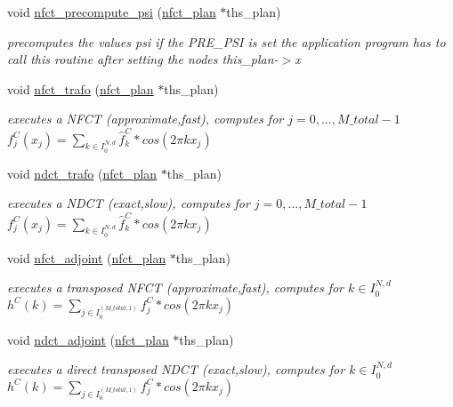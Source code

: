 \begin{CompactItemize}
void \hyperlink{group__nfsct_g2792eada84d4d363e308825dc40c2e6d}{nfct\_\-precompute\_\-psi} (\hyperlink{structnfct__plan}{nfct\_\-plan} $\ast$ths\_\-plan)
\begin{CompactList}\small\item\em precomputes the values psi if the PRE\_\-PSI is set the application program has to call this routine after setting the nodes this\_\-plan-$>$x \item\end{CompactList}\item 
void \hyperlink{group__nfsct_g73327e4f32328dcae3e9f86572a0e15a}{nfct\_\-trafo} (\hyperlink{structnfct__plan}{nfct\_\-plan} $\ast$ths\_\-plan)
\begin{CompactList}\small\item\em executes a NFCT (approximate,fast), computes for $j=0,...,M\_total-1$ $f_j^C(x_j) = \sum_{k \in I_0^{N,d}} \hat{f}_k^C * cos(2 \pi k x_j)$ \item\end{CompactList}\item 
void \hyperlink{group__nfsct_ga0ba8106a8051bb76b084543a6196b2c}{ndct\_\-trafo} (\hyperlink{structnfct__plan}{nfct\_\-plan} $\ast$ths\_\-plan)
\begin{CompactList}\small\item\em executes a NDCT (exact,slow), computes for $j=0,...,M\_total-1$ $f_j^C(x_j) = \sum_{k \in I_0^{N,d}} \hat{f}_k^C * cos(2 \pi k x_j)$ \item\end{CompactList}\item 
void \hyperlink{group__nfsct_gbc14753b2aa4ae8af85fc9632720514e}{nfct\_\-adjoint} (\hyperlink{structnfct__plan}{nfct\_\-plan} $\ast$ths\_\-plan)
\begin{CompactList}\small\item\em executes a transposed NFCT (approximate,fast), computes for $k \in I_0^{N,d}$ $h^C(k) = \sum_{j \in I_0^{(M\_total,1)}} f_j^C * cos(2 \pi k x_j)$ \item\end{CompactList}\item 
void \hyperlink{group__nfsct_g6343be73aa6b3c75ba04de78074449a8}{ndct\_\-adjoint} (\hyperlink{structnfct__plan}{nfct\_\-plan} $\ast$ths\_\-plan)
\begin{CompactList}\small\item\em executes a direct transposed NDCT (exact,slow), computes for $k \in I_0^{N,d}$ $h^C(k) = \sum_{j \in I_0^{(M\_total,1)}} f_j^C * cos(2 \pi k x_j)$ \item\end{CompactList}\item 

\end{CompactItemize}
